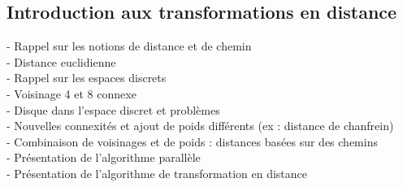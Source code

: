 \documentclass{article}
\begin{document}
\subsection{Introduction aux transformations en distance }
-	Rappel sur les notions de distance et de chemin \\
-	Distance euclidienne \\
-	Rappel sur les espaces discrets \\
-	Voisinage 4 et 8 connexe \\
-	Disque dans l’espace discret et problèmes \\
-	Nouvelles connexités et ajout de poids différents (ex : distance de chanfrein) \\
-	Combinaison de voisinages et de poids : distances basées sur des chemins \\
-	Présentation de l’algorithme parallèle \\
-	Présentation de l’algorithme de transformation en distance \\

      
\end{document}
